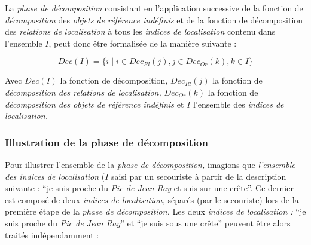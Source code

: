 La \emph{phase de décomposition} consistant en l’application
successive de la fonction de \emph{décomposition} des \emph{objets de
  référence indéfinis} et de la fonction de décomposition des
\emph{relations de localisation} à tous les \emph{indices de
  localisation} contenu dans l'ensemble \(I\), peut donc être
formalisée de la manière suivante :

\begin{equation}
  Dec(I) = \{ i \mid i \in Dec_{Rl}(j), j \in  Dec_{Or}(k), k \in I\} 
\end{equation}

Avec \(Dec(I)\) la fonction de décomposition, \(Dec_{Rl}(j)\) la
fonction de \emph{décomposition des relations de localisation,}
\(Dec_{Or}(k)\) la fonction de \emph{décomposition des objets de
  référence indéfinis }et \(I\) l'ensemble des \emph{indices de
  localisation.}

\subsubsection{Illustration de la phase de décomposition}
\label{subsec:4-3-3-4}

Pour illustrer l'ensemble de la \emph{phase de décomposition,}
imagions que \emph{l'ensemble des indices de localisation} (\(I\)
saisi par un secouriste à partir de la description suivante :
\enquote{je suis proche du \emph{Pic de Jean Ray} et suis sur une
  crête}. Ce dernier est composé de deux \emph{indices de
  localisation,} séparés (par le secouriste) lors de la première étape
de la \emph{phase de décomposition.} Les deux \emph{indices de
  localisation :} \enquote{je suis proche du \emph{Pic de Jean Ray}}
et \enquote{je suis sous une crête} peuvent être alors traités
indépendamment :

\begin{quote}
\end{quote}

